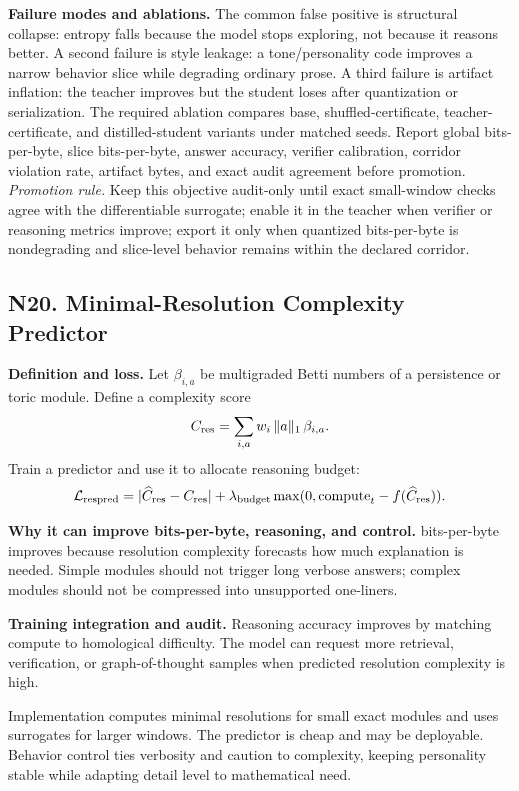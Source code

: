 \documentclass[10pt]{article}
\newcommand{\loss}{\mathcal{L}}
\numberwithin{equation}{section}
\begin{document}
\noindent\textbf{Failure modes and ablations.} The common false positive is structural collapse: entropy falls because the model stops exploring, not because it reasons better. A second failure is style leakage: a tone/personality code improves a narrow behavior slice while degrading ordinary prose. A third failure is artifact inflation: the teacher improves but the student loses after quantization or serialization. The required ablation compares base, shuffled-certificate, teacher-certificate, and distilled-student variants under matched seeds. Report global bits-per-byte, slice bits-per-byte, answer accuracy, verifier calibration, corridor violation rate, artifact bytes, and exact audit agreement before promotion.
\vfill
\noindent\emph{Promotion rule.} Keep this objective audit-only until exact small-window checks agree with the differentiable surrogate; enable it in the teacher when verifier or reasoning metrics improve; export it only when quantized bits-per-byte is nondegrading and slice-level behavior remains within the declared corridor.
\clearpage
\subsection{N20. Minimal-Resolution Complexity Predictor}
\noindent\textbf{Definition and loss.} Let $\beta_{i,a}$ be multigraded Betti numbers of a persistence or toric module. Define a complexity score
\[
C_{\rm res}=\sum_{i,a} w_i\,\|a\|_1\,\beta_{i,a}.
\]
Train a predictor and use it to allocate reasoning budget:
\[
\loss_{\rm respred}=|\widehat C_{\rm res}-C_{\rm res}|+\lambda_{\rm budget}\max(0,\mathrm{compute}_t-f(\widehat C_{\rm res})).
\]

\noindent\textbf{Why it can improve bits-per-byte, reasoning, and control.} bits-per-byte improves because resolution complexity forecasts how much explanation is needed. Simple modules should not trigger long verbose answers; complex modules should not be compressed into unsupported one-liners.

\noindent\textbf{Training integration and audit.} Reasoning accuracy improves by matching compute to homological difficulty. The model can request more retrieval, verification, or graph-of-thought samples when predicted resolution complexity is high.

Implementation computes minimal resolutions for small exact modules and uses surrogates for larger windows. The predictor is cheap and may be deployable. Behavior control ties verbosity and caution to complexity, keeping personality stable while adapting detail level to mathematical need.
\end{document}
